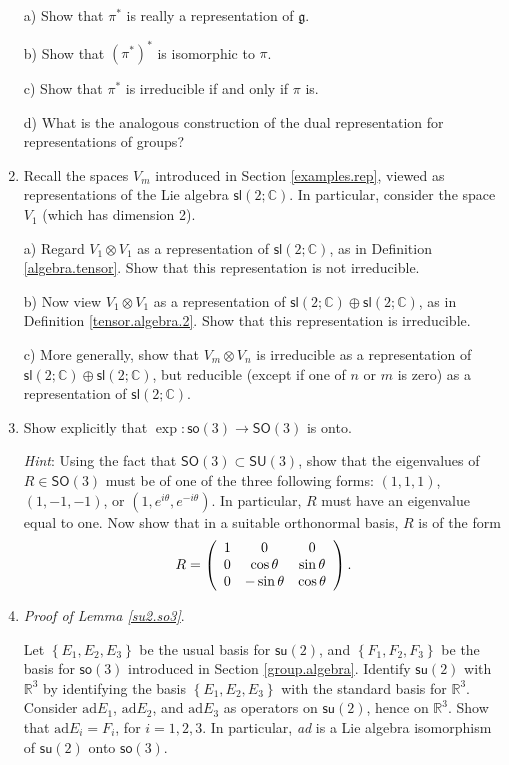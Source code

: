 \documentclass{amsbook}
\let \frak = \mathfrak
\theoremstyle{plain}
\numberwithin{equation}{chapter}
\numberwithin{theorem}{chapter}
\begin{document}
\begin{enumerate}
a) Show that $\pi^{\ast}$ is really a representation of $\frak{g}$.

b) Show that $\left(  \pi^{\ast}\right)  ^{\ast}$ is isomorphic to $\pi$.

c) Show that $\pi^{\ast}$ is irreducible if and only if $\pi$ is.

d) What is the analogous construction of the dual representation for
representations of groups?

\item \label{c.g}Recall the spaces $V_{m}$ introduced in Section
\ref{examples.rep}, viewed as representations of the Lie algebra
$\mathsf{sl}(2;\mathbb{C})$. In particular, consider the space $V_{1}$ (which
has dimension 2).

a) Regard $V_{1}\otimes V_{1}$ as a representation of $\mathsf{sl}%
(2;\mathbb{C})$, as in Definition \ref{algebra.tensor}. Show that this
representation is not irreducible.

b) Now view $V_{1}\otimes V_{1}$ as a representation of $\mathsf{sl}%
(2;\mathbb{C})\oplus\mathsf{sl}(2;\mathbb{C})$, as in Definition
\ref{tensor.algebra.2}. Show that this representation is irreducible.

c) More generally, show that $V_{m}\otimes V_{n}$ is irreducible as a
representation of $\mathsf{sl}(2;\mathbb{C})\oplus\mathsf{sl}(2;\mathbb{C})$,
but reducible (except if one of $n$ or $m$ is zero) as a representation of
$\mathsf{sl}(2;\mathbb{C})$.

\item  Show explicitly that $\exp:\mathsf{so}(3)\rightarrow\mathsf{SO}(3)$ is onto.

\textit{Hint}: Using the fact that $\mathsf{SO}(3)\subset\mathsf{SU}(3)$, show
that the eigenvalues of $R\in\mathsf{SO}(3)$ must be of one of the three
following forms: $(1,1,1)$, $(1,-1,-1)$, or $(1,e^{i\theta},e^{-i\theta})$. In
particular, $R$ must have an eigenvalue equal to one. Now show that in a
suitable orthonormal basis, $R$ is of the form
\[
R=\left(
\begin{array}
[c]{ccc}%
1 & 0 & 0\\
0 & \cos\theta & \sin\theta\\
0 & -\sin\theta & \cos\theta
\end{array}
\right)  \text{.}%
\]

\item \label{prove.su2.so3}\textit{Proof of Lemma \ref{su2.so3}}.

Let $\left\{  E_{1},E_{2},E_{3}\right\}  $ be the usual basis for
$\mathsf{su}(2)$, and $\left\{  F_{1},F_{2},F_{3}\right\}  $ be the basis for
$\mathsf{so}(3)$ introduced in Section \ref{group.algebra}. Identify
$\mathsf{su}(2)$ with $\mathbb{R}^{3}$ by identifying the basis $\left\{
E_{1},E_{2},E_{3}\right\}  $ with the standard basis for $\mathbb{R}^{3}$.
Consider $\mathrm{ad}E_{1}$, $\mathrm{ad}E_{2}$, and $\mathrm{ad}E_{3}$ as
operators on $\mathsf{su}(2)$, hence on $\mathbb{R}^{3}$. Show that
$\mathrm{ad}E_{i}=F_{i}$, for $i=1,2,3$. In particular, \textit{ad} is a Lie
algebra isomorphism of $\mathsf{su}(2)$ onto $\mathsf{so}(3)$.


\end{enumerate}
\end{document}

